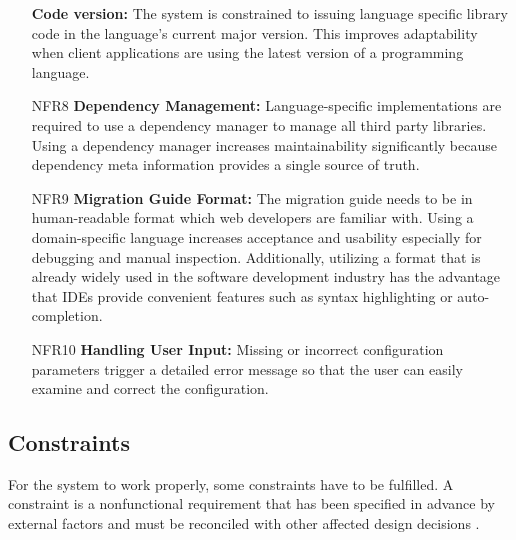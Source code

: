 \begin{itemize}[itemindent=-13pt, leftmargin=43pt, align=left]
    \textbf{Code version:} The system is constrained to issuing language specific library code in the language's current major version. This improves adaptability when client applications are using the latest version of a programming language.
    \item [NFR8\hphantom{1}] 
    \textbf{Dependency Management:} Language-specific implementations are required to use a dependency manager to manage all third party libraries. Using a dependency manager increases maintainability significantly because dependency meta information provides a single source of truth.
        \item [NFR9\hphantom{1}] 
    \textbf{Migration Guide Format:} The migration guide needs to be in human-readable format which web developers are familiar with. Using a domain-specific language increases acceptance and usability especially for debugging and manual inspection. Additionally, utilizing a format that is already widely used in the software development industry has the advantage that IDEs provide convenient features such as syntax highlighting or auto-completion.
        \item [NFR10\hphantom{1}] 
    \textbf{Handling User Input:} Missing or incorrect configuration parameters trigger a detailed error message so that the user can easily examine and correct the configuration.
\end{itemize}

\subsection{Constraints}
\label{subsec:Constraints}

For the system to work properly, some constraints have to be fulfilled. A constraint is a nonfunctional requirement that has been specified in advance by external factors and must be reconciled with other affected design decisions \cite{bass_software_2013}.

